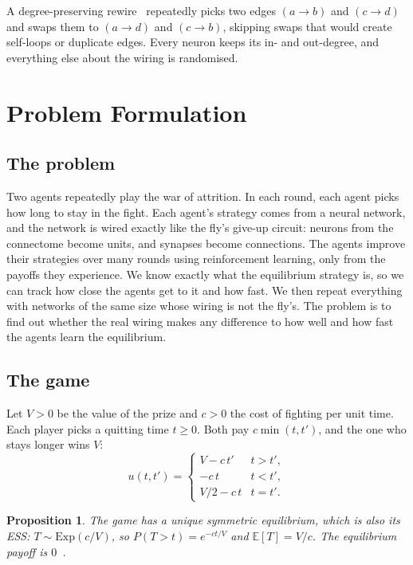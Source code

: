 \documentclass{article}
\newtheorem{proposition}{Proposition}
\newcommand{\E}{\mathbb{E}}
\begin{document}
A degree-preserving rewire~\cite{maslov2002} repeatedly picks two edges $(a \to b)$ and $(c \to d)$ and swaps them to $(a\to d)$ and $(c \to b)$, skipping swaps that would create self-loops or duplicate edges. Every neuron keeps its in- and out-degree, and everything else about the wiring is randomised.

\section{Problem Formulation}
\label{sec:formulation}

\subsection{The problem}

Two agents repeatedly play the war of attrition. In each round, each agent picks how long to stay in the fight. Each agent's strategy comes from a neural network, and the network is wired exactly like the fly's give-up circuit: neurons from the connectome become units, and synapses become connections. The agents improve their strategies over many rounds using reinforcement learning, only from the payoffs they experience. We know exactly what the equilibrium strategy is, so we can track how close the agents get to it and how fast. We then repeat everything with networks of the same size whose wiring is not the fly's. The problem is to find out whether the real wiring makes any difference to how well and how fast the agents learn the equilibrium.

\subsection{The game}

Let $V > 0$ be the value of the prize and $c > 0$ the cost of fighting per unit time. Each player picks a quitting time $t \ge 0$. Both pay $c \min(t,t')$, and the one who stays longer wins $V$:
\[
u(t,t') =
\begin{cases}
V - c\,t' & t > t',\\
-c\,t & t < t',\\
V/2 - c\,t & t = t'.
\end{cases}
\]

\begin{proposition}
The game has a unique symmetric equilibrium, which is also its ESS: $T \sim \mathrm{Exp}(c/V)$, so $P(T > t) = e^{-ct/V}$ and $\E[T] = V/c$. The equilibrium payoff is $0$~\cite{maynardsmith1974, bishop1978}.
\end{proposition}
\end{document}
